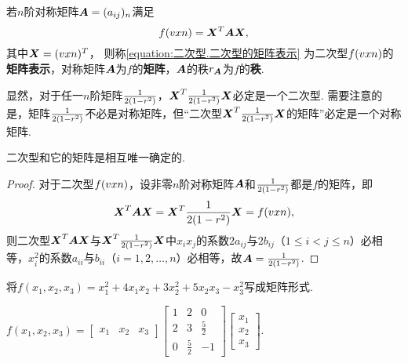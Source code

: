 \begin{definition}
若\(n\)阶对称矩阵\(\boldsymbol{A} = (a_{ij})_n\)满足
\begin{equation}\label{equation:二次型.二次型的矩阵表示}
f(v{x}{n}) = \boldsymbol{X}^T\boldsymbol{A}\boldsymbol{X},
\end{equation}其中\(\boldsymbol{X} = (v{x}{n})^T\)，%
则称\cref{equation:二次型.二次型的矩阵表示} 为二次型\(f(v{x}{n})\)的\textbf{矩阵表示}，对称矩阵\(\boldsymbol{A}\)为\(f\)的\textbf{矩阵}，\(\boldsymbol{A}\)的秩\(r_{\boldsymbol{A}}\)为\(f\)的\textbf{秩}.
\end{definition}

显然，对于任一\(n\)阶矩阵\(\frac{1}{2(1-r^2)}\)，\(\boldsymbol{X}^T\frac{1}{2(1-r^2)}\boldsymbol{X}\)必定是一个二次型.
需要注意的是，矩阵\(\frac{1}{2(1-r^2)}\)不必是对称矩阵，但“二次型\(\boldsymbol{X}^T\frac{1}{2(1-r^2)}\boldsymbol{X}\)的矩阵”必定是一个对称矩阵.

\begin{property}
二次型和它的矩阵是相互唯一确定的.
\begin{proof}
对于二次型\(f(v{x}{n})\)，设非零\(n\)阶对称矩阵\(\boldsymbol{A}\)和\(\frac{1}{2(1-r^2)}\)都是\(f\)的矩阵，即\[
\boldsymbol{X}^T\boldsymbol{A}\boldsymbol{X}
=\boldsymbol{X}^T\frac{1}{2(1-r^2)}\boldsymbol{X}
=f(v{x}{n}),
\]则二次型\(\boldsymbol{X}^T\boldsymbol{A}\boldsymbol{X}\)与\(\boldsymbol{X}^T\frac{1}{2(1-r^2)}\boldsymbol{X}\)中\(x_i x_j\)的系数\(2 a_{ij}\)与\(2 b_{ij}\)（\(1 \leqslant i < j \leqslant n\)）必相等，\(x_i^2\)的系数\(a_{ii}\)与\(b_{ii}\)（\(i=1,2,\dotsc,n\)）必相等，故\(\boldsymbol{A}=\frac{1}{2(1-r^2)}\).
\end{proof}
\end{property}

\begin{example}
将\(f(x_1,x_2,x_3) = x_1^2 + 4 x_1 x_2 + 3 x_2^2 + 5 x_2 x_3 - x_3^2\)写成矩阵形式.
\begin{solution}
\(f(x_1,x_2,x_3) = \begin{bmatrix}
x_1 & x_2 & x_3
\end{bmatrix} \begin{bmatrix}
1 & 2 & 0 \\
2 & 3 & \frac{5}{2} \\
0 & \frac{5}{2} & -1
\end{bmatrix} \begin{bmatrix}
x_1 \\ x_2 \\ x_3
\end{bmatrix}\).
\end{solution}
\end{example}


